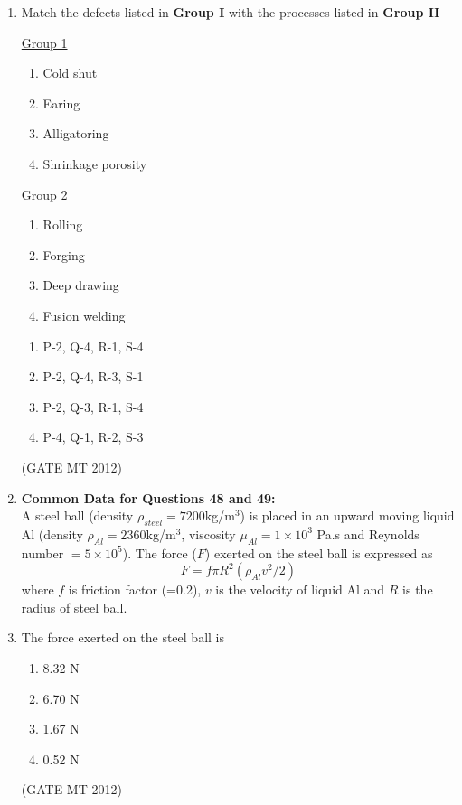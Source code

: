 \documentclass[journal, 11pt, onecolumn]{IEEEtran}
\theoremstyle{remark}
\begin{document}
\begin{enumerate}
\item Match the defects listed in \textbf{Group I} with the processes listed in \textbf{Group II}

\begin{multicols}{2}
\underline{Group 1}
\begin{enumerate}[label=(\Alph*), start=16]
\item Cold shut  
\item Earing
\item Alligatoring  
\item Shrinkage porosity
\end{enumerate}

\underline{Group 2}
\begin{enumerate}[label=(\arabic*), start=1]
\item Rolling 
\item Forging 
\item Deep drawing
\item Fusion welding
\end{enumerate}
\end{multicols}

\begin{multicols}{2}
\begin{enumerate}
\item P-2, Q-4, R-1, S-4
\item P-2, Q-4, R-3, S-1
\item P-2, Q-3, R-1, S-4
\item P-4, Q-1, R-2, S-3
\end{enumerate}
\end{multicols}
\hfill(GATE MT 2012)

\item[] \textbf{Common Data for Questions 48 and 49:} \\
A steel ball (density $\rho_{steel}=7200$kg/m$^3$) is placed in an upward moving liquid Al (density $\rho_{Al}=2360$kg/m$^3$, viscosity $\mu_{Al}=1\times10^3$ Pa.s and Reynolds number $=5\times10^5$). The force ($F$) exerted on the steel ball is expressed as \\
\[
    F = f \pi R^2 \left( \rho_{Al}v^2/2 \right)
\]
where $f$ is friction factor (=0.2), $v$ is the velocity of liquid Al and $R$ is the radius of steel ball.

\item The force exerted on the steel ball is
\begin{multicols}{2}
\begin{enumerate}  
\item 8.32 N
\item 6.70 N
\item 1.67 N
\item 0.52 N
\end{enumerate}
\end{multicols}
\hfill(GATE MT 2012)


\end{enumerate}
\end{document}
